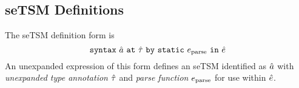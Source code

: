 
\subsection{seTSM Definitions}\label{sec:U-uetsm-definition}
The seTSM definition form is \[\texttt{syntax}~\hat{a}~\texttt{at}~{\hat\tau}~\texttt{by}~\texttt{static}~e_\text{parse}~\texttt{in}~{\hat e}\] 
An unexpanded expression of this form defines an {seTSM} identified as $\hat{a}$ with \emph{unexpanded type annotation} ${\hat\tau}$ and \emph{parse function} $e_\text{parse}$ for use within ${\hat e}$. 

